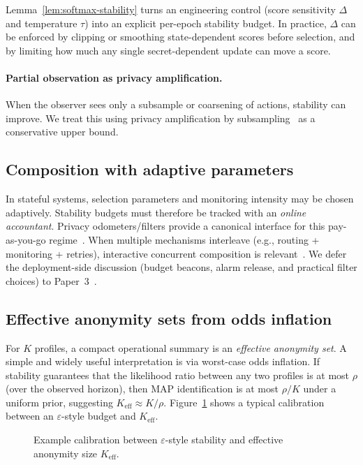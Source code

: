 \documentclass[11pt]{article}
\begin{document}
Lemma~\ref{lem:softmax-stability} turns an engineering control (score sensitivity $\Delta$ and temperature $\tau$) into an explicit per-epoch stability budget.
In practice, $\Delta$ can be enforced by clipping or smoothing state-dependent scores before selection, and by limiting how much any single secret-dependent update can move a score.

\paragraph{Partial observation as privacy amplification.}
When the observer sees only a subsample or coarsening of actions, stability can improve.
We treat this using privacy amplification by subsampling~\cite{balle2018subsampling} as a conservative upper bound.

\subsection{Composition with adaptive parameters}
In stateful systems, selection parameters and monitoring intensity may be chosen adaptively.
Stability budgets must therefore be tracked with an \emph{online accountant}.
Privacy odometers/filters provide a canonical interface for this pay-as-you-go regime~\cite{rogers2016odometers,whitehouse2023fullyadaptive}.
When multiple mechanisms interleave (e.g., routing + monitoring + retries), interactive concurrent composition is relevant~\cite{vadhanwang2021concurrentdp,zhang2023concurrentinteractive}.
We defer the deployment-side discussion (budget beacons, alarm release, and practical filter choices) to Paper~3~\cite{series:state3}.
\subsection{Effective anonymity sets from odds inflation}
For $K$ profiles, a compact operational summary is an \emph{effective anonymity set}.
A simple and widely useful interpretation is via worst-case odds inflation.
If stability guarantees that the likelihood ratio between any two profiles is at most $\rho$ (over the observed horizon), then MAP identification is at most $\rho/K$ under a uniform prior, suggesting
$K_{\mathrm{eff}}\approx K/\rho$.
Figure~\ref{fig:keff-vs-eps} shows a typical calibration between an $\varepsilon$-style budget and $K_{\mathrm{eff}}$.

\begin{figure}[t]
  \centering
  \caption{Example calibration between $\varepsilon$-style stability and effective anonymity size $K_{\mathrm{eff}}$.}
  \label{fig:keff-vs-eps}
\end{figure}
\end{document}
